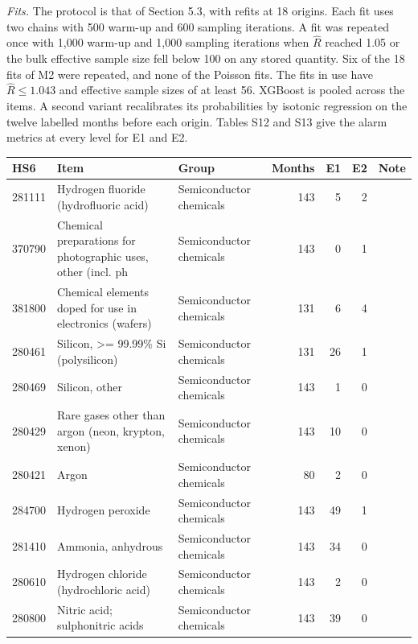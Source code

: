 \documentclass[10pt,a4paper]{article}
\begin{document}
\textit{Fits.} The protocol is that of Section 5.3, with refits at 18 origins. Each fit uses two chains with 500 warm-up and 600 sampling iterations. A fit was repeated once with 1,000 warm-up and 1,000 sampling iterations when $\widehat{R}$ reached 1.05 or the bulk effective sample size fell below 100 on any stored quantity. Six of the 18 fits of M2 were repeated, and none of the Poisson fits. The fits in use have $\widehat{R} \leq 1.043$ and effective sample sizes of at least 56. XGBoost is pooled across the items. A second variant recalibrates its probabilities by isotonic regression on the twelve labelled months before each origin. Tables S12 and S13 give the alarm metrics at every level for E1 and E2.

\vspace{6pt}
\noindent\begin{minipage}{\linewidth}
\centering\tiny
\begin{tabular}{llp{3.2cm}rrrl}
\toprule
HS6 & Item & Group & Months & E1 & E2 & Note \\ \midrule
281111 & Hydrogen fluoride (hydrofluoric acid) & Semiconductor chemicals & 143 & 5 & 2 &  \\
370790 & Chemical preparations for photographic uses, other (incl. ph & Semiconductor chemicals & 143 & 0 & 1 &  \\
381800 & Chemical elements doped for use in electronics (wafers) & Semiconductor chemicals & 131 & 6 & 4 &  \\
280461 & Silicon, >= 99.99\% Si (polysilicon) & Semiconductor chemicals & 131 & 26 & 1 &  \\
280469 & Silicon, other & Semiconductor chemicals & 143 & 1 & 0 &  \\
280429 & Rare gases other than argon (neon, krypton, xenon) & Semiconductor chemicals & 143 & 10 & 0 &  \\
280421 & Argon & Semiconductor chemicals & 80 & 2 & 0 &  \\
284700 & Hydrogen peroxide & Semiconductor chemicals & 143 & 49 & 1 &  \\
281410 & Ammonia, anhydrous & Semiconductor chemicals & 143 & 34 & 0 &  \\
280610 & Hydrogen chloride (hydrochloric acid) & Semiconductor chemicals & 143 & 2 & 0 &  \\
280800 & Nitric acid; sulphonitric acids & Semiconductor chemicals & 143 & 39 & 0 &  \\

\end{tabular}
\end{minipage}
\end{document}
